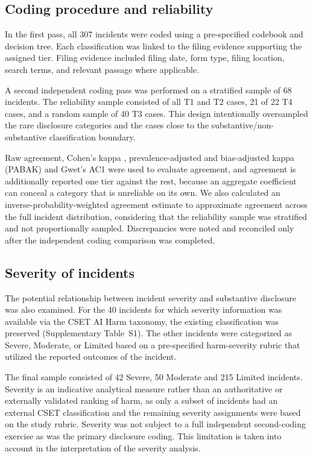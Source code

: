 \documentclass[utf8]{FrontiersinHarvard}
\begin{document}
\subsection{Coding procedure and reliability}
In the first pass, all 307 incidents were coded using a pre-specified codebook and decision tree. Each classification was linked to the filing evidence supporting the assigned tier. Filing evidence included filing date, form type, filing location, search terms, and relevant passage where applicable.

A second independent coding pass was performed on a stratified sample of 68 incidents. The reliability sample consisted of all T1 and T2 cases, 21 of 22 T4 cases, and a random sample of 40 T3 cases. This design intentionally oversampled the rare disclosure categories and the cases close to the substantive/non-substantive classification boundary.

Raw agreement, Cohen's kappa \citep{Cohen1960}, prevalence-adjusted and bias-adjusted kappa (PABAK) and Gwet's AC1 \citep{Gwet2008} were used to evaluate agreement, and agreement is additionally reported one tier against the rest, because an aggregate coefficient can conceal a category that is unreliable on its own. We also calculated an inverse-probability-weighted agreement estimate to approximate agreement across the full incident distribution, considering that the reliability sample was stratified and not proportionally sampled. Discrepancies were noted and reconciled only after the independent coding comparison was completed.

\subsection{Severity of incidents}\label{sec:sev}
The potential relationship between incident severity and substantive disclosure was also examined. For the 40 incidents for which severity information was available via the CSET AI Harm taxonomy, the existing classification was preserved (Supplementary Table~S1). The other incidents were categorized as Severe, Moderate, or Limited based on a pre-specified harm-severity rubric that utilized the reported outcomes of the incident.

The final sample consisted of 42 Severe, 50 Moderate and 215 Limited incidents. Severity is an indicative analytical measure rather than an authoritative or externally validated ranking of harm, as only a subset of incidents had an external CSET classification and the remaining severity assignments were based on the study rubric. Severity was not subject to a full independent second-coding exercise as was the primary disclosure coding. This limitation is taken into account in the interpretation of the severity analysis.
\end{document}
